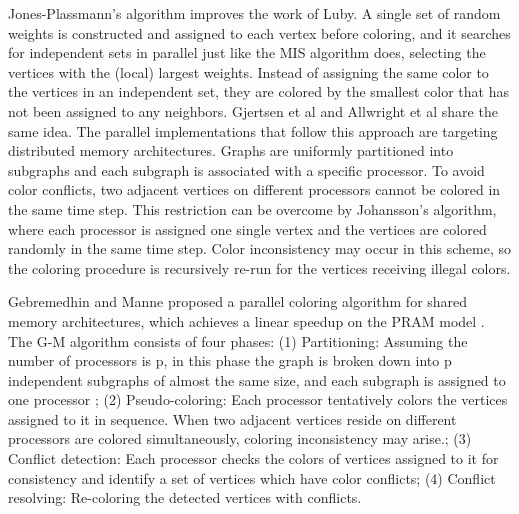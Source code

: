 \documentclass[preprint]{sigplanconf}
\begin{document}
Jones-Plassmann’s algorithm \cite{jones1993parallel}  improves the work of Luby. A single set of random weights is constructed and assigned to each vertex before coloring, and it searches for independent sets in parallel just like the MIS algorithm does, selecting the vertices with the (local) largest weights. Instead of assigning the same color to the vertices in an independent set, they are colored by the smallest color that has not been assigned to any neighbors. Gjertsen et al \cite{gjertsen1996parallel} and Allwright et al \cite{allwright1995comparison} share the same idea.  The parallel implementations that follow this approach are targeting distributed memory architectures.  Graphs are uniformly partitioned into subgraphs and each subgraph is associated with a specific processor.  To avoid color conflicts, two adjacent vertices on different processors cannot be colored in the same time step. This restriction can be overcome by Johansson’s algorithm, where each processor is assigned one single vertex and the vertices are colored randomly in the same time step. Color inconsistency may occur in this  scheme, so the coloring procedure is recursively re-run for the vertices receiving illegal colors.

Gebremedhin and Manne proposed a  parallel coloring algorithm for shared memory architectures, which achieves a linear speedup on the PRAM model \cite{gebremedhin2000scalable} . The G-M algorithm consists of four phases: (1) Partitioning: Assuming the number of processors is p, in this phase the graph is broken down into p independent subgraphs of almost the same size, and each subgraph is assigned to one processor ; (2) Pseudo-coloring: Each processor tentatively colors the vertices assigned to it in sequence. When two adjacent vertices reside on different processors are colored simultaneously, coloring inconsistency may arise.; (3) Conflict detection:  Each processor checks the colors of  vertices assigned to it for consistency and identify a set of vertices which have color conflicts; (4) Conflict resolving: Re-coloring the detected vertices with conflicts.

\begin{algorithm}
\begin{algorithmic}
\
    {
    \ENDFOR
    \ENDFOR}
 
\ENDIF
\ENDFOR
\ENDFOR
{}
\end{algorithmic}
\end{algorithm}           
\end{document}
